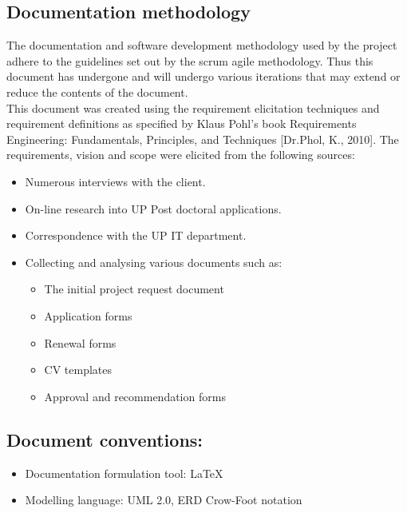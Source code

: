 \documentclass[12pt]{article}
\begin{document}
\vspace{0.2in}

\subsection{Documentation methodology}
\vspace{0.2in}
\begin{flushleft}
The documentation and software development methodology used by the project adhere to the guidelines set out by the scrum agile methodology. Thus this document has undergone and will undergo various iterations that may extend or reduce the contents of the document.\\

This document was created using the requirement elicitation techniques and requirement definitions as specified by Klaus Pohl’s book Requirements Engineering: Fundamentals, Principles, and Techniques [Dr.Phol, K., 2010].
The requirements, vision and scope were elicited from the following sources:
\begin{itemize}
	\item Numerous interviews with the client.
	\item On-line research into UP Post doctoral applications.
	\item Correspondence with the UP IT department.
	\item Collecting and analysing various documents such as:
		\begin{itemize}
			\item The initial project request document
			\item Application forms
			\item Renewal forms
			\item CV templates
			\item Approval and recommendation forms
		\end{itemize}
\end{itemize}
\end{flushleft}	

\vspace{0.5in}

\subsection{Document conventions:}
\vspace{0.1in}
\begin{itemize}
\item Documentation formulation tool: LaTeX
\item Modelling language: UML 2.0, ERD Crow-Foot notation
\end{itemize}
\end{document}
